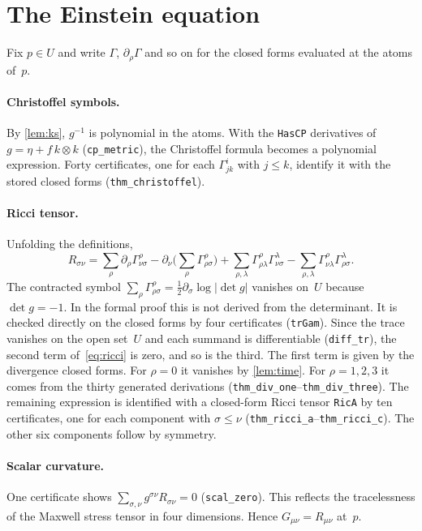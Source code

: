 \documentclass[11pt]{article}
\theoremstyle{definition}
\theoremstyle{remark}
\newcommand{\lean}[1]{\lstinline[basicstyle=\ttfamily\normalsize,columns=fullflexible,breaklines=false]{#1}}
\begin{document}
\section{The Einstein equation}\label{sec:einstein}

Fix $p\in U$ and write $\Gamma$, $\partial_\rho\Gamma$ and so on for the closed forms evaluated at the atoms of~$p$.

\paragraph{Christoffel symbols.}
By \cref{lem:ks}, $g^{-1}$ is polynomial in the atoms.
With the \lean{HasCP} derivatives of $g=\eta+f\,k\otimes k$ (\lean{cp_metric}), the Christoffel formula becomes a polynomial expression.
Forty certificates, one for each $\Gamma^i_{jk}$ with $j\le k$, identify it with the stored closed forms (\lean{thm_christoffel}).

\paragraph{Ricci tensor.}
Unfolding the definitions,
\begin{equation}\label{eq:ricci}
  R_{\sigma\nu}=\sum_\rho\partial_\rho\Gamma^\rho_{\nu\sigma}
  -\partial_\nu\Big(\sum_\rho\Gamma^\rho_{\rho\sigma}\Big)
  +\sum_{\rho,\lambda}\Gamma^\rho_{\rho\lambda}\Gamma^\lambda_{\nu\sigma}
  -\sum_{\rho,\lambda}\Gamma^\rho_{\nu\lambda}\Gamma^\lambda_{\rho\sigma}.
\end{equation}
The contracted symbol $\sum_\rho\Gamma^\rho_{\rho\sigma}=\frac12\partial_\sigma\log|\det g|$ vanishes on~$U$ because $\det g=-1$.
In the formal proof this is not derived from the determinant.
It is checked directly on the closed forms by four certificates (\lean{trGam}).
Since the trace vanishes on the open set~$U$ and each summand is differentiable (\lean{diff_tr}), the second term of~\eqref{eq:ricci} is zero, and so is the third.
The first term is given by the divergence closed forms.
For $\rho=0$ it vanishes by \cref{lem:time}.
For $\rho=1,2,3$ it comes from the thirty generated derivations (\lean{thm_div_one}--\lean{thm_div_three}).
The remaining expression is identified with a closed-form Ricci tensor \lean{RicA} by ten certificates, one for each component with $\sigma\le\nu$ (\lean{thm_ricci_a}--\lean{thm_ricci_c}).
The other six components follow by symmetry.

\paragraph{Scalar curvature.}
One certificate shows $\sum_{\sigma,\nu}g^{\sigma\nu}R_{\sigma\nu}=0$ (\lean{scal_zero}).
This reflects the tracelessness of the Maxwell stress tensor in four dimensions.
Hence $G_{\mu\nu}=R_{\mu\nu}$ at~$p$.
\end{document}
